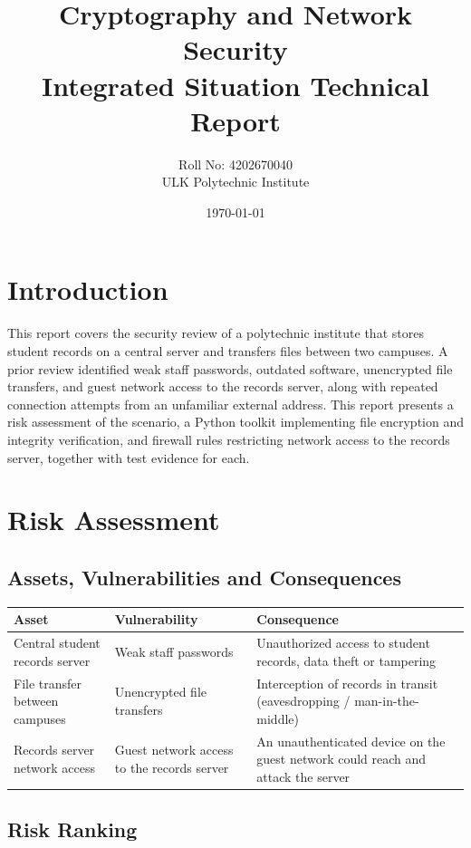 \documentclass[11pt]{article}
\title{Cryptography and Network Security \\ Integrated Situation Technical Report}
\author{Roll No: 4202670040 \\ ULK Polytechnic Institute}
\date{\today}
\begin{document}
\maketitle

\section{Introduction}
This report covers the security review of a polytechnic institute that stores student records
on a central server and transfers files between two campuses. A prior review identified weak
staff passwords, outdated software, unencrypted file transfers, and guest network access to the
records server, along with repeated connection attempts from an unfamiliar external address.
This report presents a risk assessment of the scenario, a Python toolkit implementing file
encryption and integrity verification, and firewall rules restricting network access to the
records server, together with test evidence for each.

\section{Risk Assessment}
\subsection{Assets, Vulnerabilities and Consequences}


\begin{center}
\begin{tabular}{@{}p{3.8cm}p{4.2cm}p{5.5cm}@{}}
\toprule
Asset & Vulnerability & Consequence \\
\midrule
Central student records server & Weak staff passwords & Unauthorized access to student records, data theft or tampering \\
File transfer between campuses & Unencrypted file transfers & Interception of records in transit (eavesdropping / man-in-the-middle) \\
Records server network access & Guest network access to the records server & An unauthenticated device on the guest network could reach and attack the server \\
\bottomrule
\end{tabular}
\end{center}

\subsection{Risk Ranking}
\end{document}
